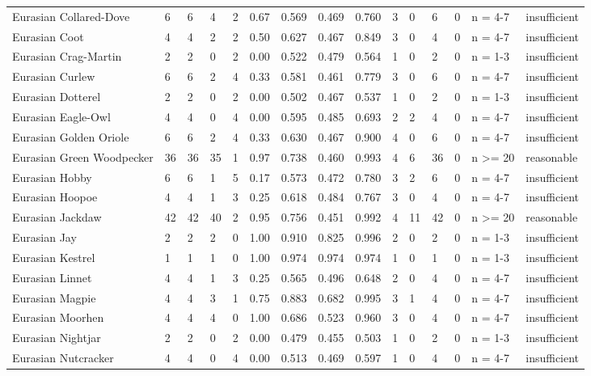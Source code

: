 \begin{landscape}
\begin{longtable}{L{3.6cm}*{12}{C{0.90cm}}L{1.45cm}L{1.65cm}}
Eurasian Collared-Dove & 6 & 6 & 4 & 2 & 0.67 & 0.569 & 0.469 & 0.760 & 3 & 0 & 6 & 0 & n = 4-7 & insufficient \\
Eurasian Coot & 4 & 4 & 2 & 2 & 0.50 & 0.627 & 0.467 & 0.849 & 3 & 0 & 4 & 0 & n = 4-7 & insufficient \\
Eurasian Crag-Martin & 2 & 2 & 0 & 2 & 0.00 & 0.522 & 0.479 & 0.564 & 1 & 0 & 2 & 0 & n = 1-3 & insufficient \\
Eurasian Curlew & 6 & 6 & 2 & 4 & 0.33 & 0.581 & 0.461 & 0.779 & 3 & 0 & 6 & 0 & n = 4-7 & insufficient \\
Eurasian Dotterel & 2 & 2 & 0 & 2 & 0.00 & 0.502 & 0.467 & 0.537 & 1 & 0 & 2 & 0 & n = 1-3 & insufficient \\
Eurasian Eagle-Owl & 4 & 4 & 0 & 4 & 0.00 & 0.595 & 0.485 & 0.693 & 2 & 2 & 4 & 0 & n = 4-7 & insufficient \\
Eurasian Golden Oriole & 6 & 6 & 2 & 4 & 0.33 & 0.630 & 0.467 & 0.900 & 4 & 0 & 6 & 0 & n = 4-7 & insufficient \\
Eurasian Green Woodpecker & 36 & 36 & 35 & 1 & 0.97 & 0.738 & 0.460 & 0.993 & 4 & 6 & 36 & 0 & n >= 20 & reasonable \\
Eurasian Hobby & 6 & 6 & 1 & 5 & 0.17 & 0.573 & 0.472 & 0.780 & 3 & 2 & 6 & 0 & n = 4-7 & insufficient \\
Eurasian Hoopoe & 4 & 4 & 1 & 3 & 0.25 & 0.618 & 0.484 & 0.767 & 3 & 0 & 4 & 0 & n = 4-7 & insufficient \\
Eurasian Jackdaw & 42 & 42 & 40 & 2 & 0.95 & 0.756 & 0.451 & 0.992 & 4 & 11 & 42 & 0 & n >= 20 & reasonable \\
Eurasian Jay & 2 & 2 & 2 & 0 & 1.00 & 0.910 & 0.825 & 0.996 & 2 & 0 & 2 & 0 & n = 1-3 & insufficient \\
Eurasian Kestrel & 1 & 1 & 1 & 0 & 1.00 & 0.974 & 0.974 & 0.974 & 1 & 0 & 1 & 0 & n = 1-3 & insufficient \\
Eurasian Linnet & 4 & 4 & 1 & 3 & 0.25 & 0.565 & 0.496 & 0.648 & 2 & 0 & 4 & 0 & n = 4-7 & insufficient \\
Eurasian Magpie & 4 & 4 & 3 & 1 & 0.75 & 0.883 & 0.682 & 0.995 & 3 & 1 & 4 & 0 & n = 4-7 & insufficient \\
Eurasian Moorhen & 4 & 4 & 4 & 0 & 1.00 & 0.686 & 0.523 & 0.960 & 3 & 0 & 4 & 0 & n = 4-7 & insufficient \\
Eurasian Nightjar & 2 & 2 & 0 & 2 & 0.00 & 0.479 & 0.455 & 0.503 & 1 & 0 & 2 & 0 & n = 1-3 & insufficient \\
Eurasian Nutcracker & 4 & 4 & 0 & 4 & 0.00 & 0.513 & 0.469 & 0.597 & 1 & 0 & 4 & 0 & n = 4-7 & insufficient \\

\end{longtable}
\end{landscape}
